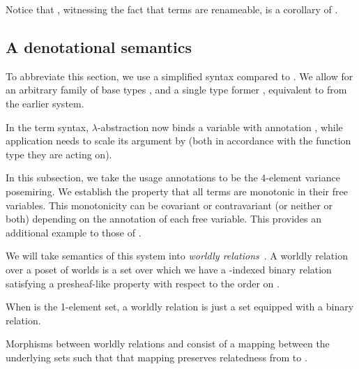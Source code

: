 
Notice that , witnessing the fact
that terms are renameable, is a corollary of .


\subsection{A denotational semantics}

To abbreviate this section, we use a simplified syntax compared to \name{}.
We allow for an arbitrary family of base types , and a single
type former \mbox{}, equivalent to
\mbox{} from the earlier system.


In the term syntax, $\lambda$-abstraction now binds a variable with annotation
, while application needs to scale its argument by 
(both in accordance with the function type they are acting on).


In this subsection, we take the usage annotations to be the 4-element variance
posemiring.
We establish the property that all terms are monotonic in their free variables.
This monotonicity can be covariant or contravariant (or neither or both)
depending on the annotation of each free variable.
This provides an additional example to those of \citet{AbelBernardy2020}.

We will take semantics of this system into
\emph{worldly relations}~\cite{AbelBernardy2020}.
A worldly relation over a poset of worlds  is a set over which
we have a -indexed binary relation satisfying a presheaf-like
property with respect to the order on .


\begin{example}
  When  is the 1-element set, a worldly relation is just a set
  equipped with a binary relation.
\end{example}

Morphisms between worldly relations  and  consist of
a mapping between the underlying sets such that that mapping preserves
relatedness from  to .

